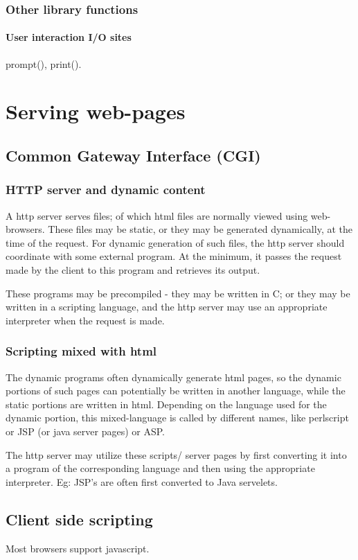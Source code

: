\section{Other library functions}
\subsection{User interaction I/O sites}
prompt(), print().

\part{Serving web-pages}
\chapter{Common Gateway Interface (CGI)}
\section{HTTP server and dynamic content}
A http server serves files; of which html files are normally viewed using web-browsers. These files may be static, or they may be generated dynamically, at the time of the request. For dynamic generation of such files, the http server should coordinate with some external program. At the minimum, it passes the request made by the client to this program and retrieves its output.

These programs may be precompiled - they may be written in C; or they may be written in a scripting language, and the http server may use an appropriate interpreter when the request is made.

\section{Scripting mixed with html}
The dynamic programs often dynamically generate html pages, so the dynamic portions of such pages can potentially be written in another language, while the static portions are written in html. Depending on the language used for the dynamic portion, this mixed-language is called by different names, like perlscript or JSP (or java server pages) or ASP.

The http server may utilize these scripts/ server pages by first converting it into a program of the corresponding language and then using the appropriate interpreter. Eg: JSP's are often first converted to Java servelets.

\chapter{Client side scripting}
Most browsers support javascript.

